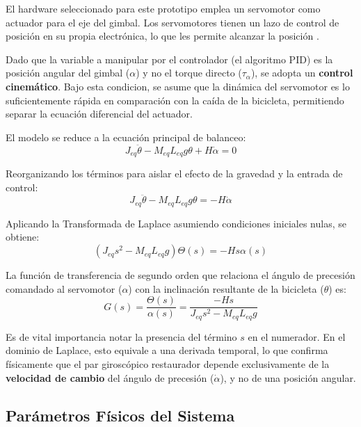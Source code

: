 \documentclass[12pt,letterpaper]{report}
\begin{document}
El hardware seleccionado para este prototipo emplea un servomotor como actuador para el eje del gimbal. Los servomotores tienen un lazo de control de posición en su propia electrónica, lo que les permite alcanzar la posición . 

Dado que la variable a manipular por el controlador (el algoritmo PID) es la posición angular del gimbal ($\alpha$) y no el torque directo ($\tau_\alpha$), se adopta un \textbf{control cinemático}. Bajo esta condicion, se asume que la dinámica del servomotor es lo suficientemente rápida en comparación con la caída de la bicicleta, permitiendo separar la ecuación diferencial del actuador.

El modelo se reduce a la ecuación principal de balanceo:
\begin{equation}
    J_{eq}\ddot{\theta} - M_{eq}L_{eq}g\theta + H\dot{\alpha} = 0
\end{equation}

Reorganizando los términos para aislar el efecto de la gravedad y la entrada de control:
\begin{equation}
    J_{eq}\ddot{\theta} - M_{eq}L_{eq}g\theta = -H\dot{\alpha}
\end{equation}

Aplicando la Transformada de Laplace asumiendo condiciones iniciales nulas, se obtiene:
\begin{equation}
    (J_{eq}s^2 - M_{eq}L_{eq}g)\Theta(s) = -Hs \alpha(s)
\end{equation}

La función de transferencia de segundo orden que relaciona el ángulo de precesión comandado al servomotor ($\alpha$) con la inclinación resultante de la bicicleta ($\theta$) es:
\begin{equation}
    G(s) = \frac{\Theta(s)}{\alpha(s)} = \frac{-Hs}{J_{eq}s^2 - M_{eq}L_{eq}g}
    \label{eq:tf_2nd_order}
\end{equation}

Es de vital importancia notar la presencia del término $s$ en el numerador. En el dominio de Laplace, esto equivale a una derivada temporal, lo que confirma físicamente que el par giroscópico restaurador depende exclusivamente de la \textbf{velocidad de cambio} del ángulo de precesión ($\dot{\alpha}$), y no de una posición angular.

\subsection*{Parámetros Físicos del Sistema}
\end{document}
